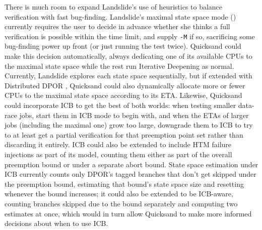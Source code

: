 There is much room to expand Landslide's use of heuristics to balance verification with fast bug-finding.
Landslide's maximal state space mode (\sect{\ref{sec:tm-verif}}) currently requires the user to decide in advance
whether she thinks a full verification is possible within the time limit,
and supply {\tt -M} if so,
sacrificing some bug-finding power up front
(or just running the test twice).
Quicksand could make this decision automatically,
always dedicating one of its available CPUs to the maximal state space
while the rest run Iterative Deepening as normal.
Currently, Landslide explores each state space sequentially,
but if extended with Distributed DPOR \cite{parallel-dpor},
Quicksand could also dynamically allocate more or fewer CPUs to the maximal state space according to its ETA.
Likewise, Quicksand could
incorporate ICB \cite{chess-icb}
to get the best of both worlds:
when testing smaller data-race jobs,
start them in ICB mode to begin with,
and when the ETAs of larger jobs (including the maximal one) grow too large,
downgrade them to ICB to try to at least get a partial verification for that preemption point set
rather than discarding it entirely.
ICB could also be extended to include HTM failure injections as part of its model,
counting them either as part of the overall preemption bound
or under a separate abort bound.
State space estimation under ICB currently
counts only DPOR's tagged branches that don't get skipped under the preemption bound,
estimating that bound's state space size
and resetting whenever the bound increases;
it could also be extended to be ICB-aware,
counting branches skipped due to the bound separately
and computing two estimates at once,
which would in turn allow Quicksand to make more informed decisions about when to use ICB.


